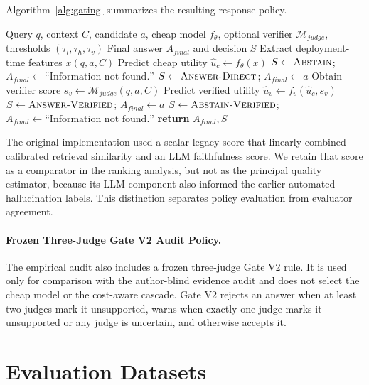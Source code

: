 \documentclass[smallextended]{svjour3}
\begin{document}
Algorithm~\ref{alg:gating} summarizes the resulting response policy.

\begin{algorithm}[htbp]
\caption{Cost-Aware Selective Answering Protocol}
\label{alg:gating}
\begin{algorithmic}[1]
\Require Query $q$, context $C$, candidate $a$, cheap model $f_{\theta}$, optional verifier $\mathcal{M}_{judge}$, thresholds $(\tau_l,\tau_h,\tau_v)$
\Ensure Final answer $A_{final}$ and decision $S$
\State Extract deployment-time features $x(q,a,C)$
\State Predict cheap utility $\hat{u}_{c}\gets f_{\theta}(x)$
    \State $S\gets\textsc{Abstain}$; $A_{final}\gets\text{``Information not found.''}$
    \State $S\gets\textsc{Answer-Direct}$; $A_{final}\gets a$
\Else
    \State Obtain verifier score $s_v\gets\mathcal{M}_{judge}(q,a,C)$
    \State Predict verified utility $\hat{u}_{v}\gets f_v(\hat{u}_{c},s_v)$
        \State $S\gets\textsc{Answer-Verified}$; $A_{final}\gets a$
    \Else
        \State $S\gets\textsc{Abstain-Verified}$; $A_{final}\gets\text{``Information not found.''}$
    \EndIf
\EndIf
\State \textbf{return} $A_{final}, S$
\end{algorithmic}
\end{algorithm}

The original implementation used a scalar legacy score that linearly combined calibrated retrieval similarity and an LLM faithfulness score. We retain that score as a comparator in the ranking analysis, but not as the principal quality estimator, because its LLM component also informed the earlier automated hallucination labels. This distinction separates policy evaluation from evaluator agreement.

\paragraph{Frozen Three-Judge Gate V2 Audit Policy.}
The empirical audit also includes a frozen three-judge Gate V2 rule. It is used only for comparison with the author-blind evidence audit and does not select the cheap model or the cost-aware cascade. Gate V2 rejects an answer when at least two judges mark it unsupported, warns when exactly one judge marks it unsupported or any judge is uncertain, and otherwise accepts it.

\section{Evaluation Datasets}
\label{sec:dataset}
\end{document}
